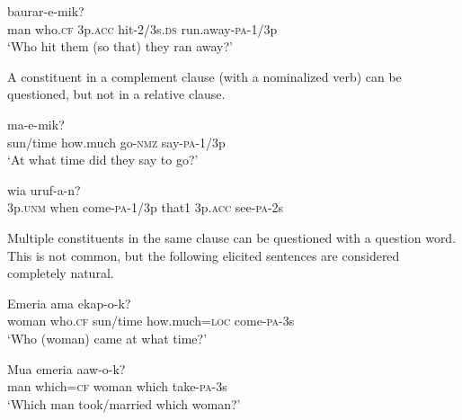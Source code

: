 \ea%
\label{ex:x1168}
\gll {}        baurar-e-mik? \\
man  who.\textsc{cf}  3p.\textsc{acc}  hit-2/3s.\textsc{ds}  run.away-\textsc{pa}-1/3p      \\
\glt `Who hit them (so that) they ran away?'
\z





A constituent in a complement clause (with a nominalized verb) can be questioned, but not in a relative clause. 

\ea%
\label{ex:x1175}
\gll {}      ma-e-mik? \\
sun/time  how.much  go-\textsc{nmz}  say-\textsc{pa}-1/3p      \\
\glt `At what time did they say to go?'
\z





\ea%
\label{ex:x1176}
\gll {}        wia  uruf-a-n? \\
3p.\textsc{unm}  when  come-\textsc{pa}-1/3p  that1  3p.\textsc{acc}  see-\textsc{pa}-2s \\
\glt
\z



Multiple constituents in the same clause can be questioned with a question word. This is not common, but the following elicited sentences are considered completely natural. 

\ea%
\label{ex:x1177}
\gll Emeria    ama    ekap-o-k? \\
woman  who.\textsc{cf}  sun/time  how.much=\textsc{loc}  come-\textsc{pa}-3s      \\
\glt `Who (woman) came at what time?'
\z





\ea%
\label{ex:x1178}
\gll Mua    emeria    aaw-o-k? \\
man  which=\textsc{cf}  woman  which  take-\textsc{pa}-3s      \\
\glt `Which man took/married which woman?'
\z





